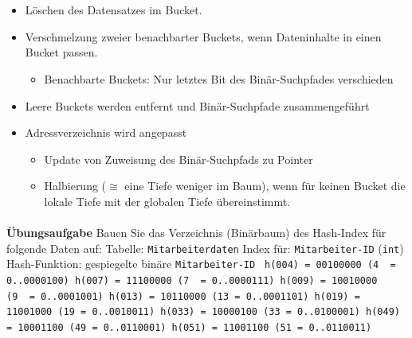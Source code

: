\begin{frame}{\insertsection}
\framesubtitle{\insertsubsection}	
\\[4pt]
\begin{itemize}
\item L\"oschen des Datensatzes im Bucket.
\item Verschmelzung zweier benachbarter Buckets, wenn Dateninhalte in einen Bucket passen.
\begin{itemize}
\item Benachbarte Buckets: Nur letztes Bit des Bin\"ar-Suchpfades verschieden
\end{itemize}		
\item Leere Buckets werden entfernt und Bin\"ar-Suchpfade zusammengef\"uhrt
\item Adressverzeichnis wird angepasst 
\begin{itemize}
\item Update von Zuweisung des Bin\"ar-Suchpfads zu Pointer 
\item Halbierung ($\cong$ eine Tiefe weniger im Baum), wenn f\"ur keinen Bucket 
die lokale Tiefe mit der globalen Tiefe \"ubereinstimmt.
\end{itemize}		
\end{itemize}	
\end{frame}

\begin{frame}{\insertsection}
\framesubtitle{\insertsubsection}	
\begin{block}{\textbf{\"Ubungsaufgabe}}
Bauen Sie das Verzeichnis (Bin\"arbaum)	des Hash-Index f\"ur folgende Daten auf:
\abs
Tabelle: \texttt{Mitarbeiterdaten}
\nl
Index f\"ur: \texttt{Mitarbeiter-ID} (\texttt{int})
\nl
Hash-Funktion: gespiegelte binäre \texttt{Mitarbeiter-ID}
\texttt{
\abs  
h(004) = 00100000     (4\ \ = 0..0000100)
\nl
h(007) = 11100000     (7\ \ = 0..0000111)
\nl
h(009) = 10010000     (9\ \ = 0..0001001)
\nl
h(013) = 10110000     (13 = 0..0001101)
\nl
h(019) = 11001000     (19 = 0..0010011)
\nl
h(033) = 10000100     (33 = 0..0100001)
\nl
h(049) = 10001100     (49 = 0..0110001)
\nl
h(051) = 11001100     (51 = 0..0110011)
}
\end{block}
\end{frame}

